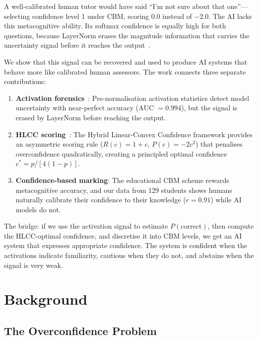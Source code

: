 \documentclass[11pt,a4paper]{article}
\begin{document}
A well-calibrated human tutor would have said ``I'm not sure about that one''---selecting confidence level 1 under CBM, scoring $0.0$ instead of $-2.0$.
The AI lacks this metacognitive ability.
Its softmax confidence is equally high for both questions, because LayerNorm erases the magnitude information that carries the uncertainty signal before it reaches the output~\citep{mccallum2026activation}.

We show that this signal can be recovered and used to produce AI systems that behave more like calibrated human assessors.
The work connects three separate contributions:

\begin{enumerate}
    \item \textbf{Activation forensics}~\citep{mccallum2026activation}: Pre-normalisation activation statistics detect model uncertainty with near-perfect accuracy (AUC $= 0.994$), but the signal is erased by LayerNorm before reaching the output.

    \item \textbf{HLCC scoring}~\citep{mccallum2026hlcc}: The Hybrid Linear-Convex Confidence framework provides an asymmetric scoring rule ($R(c) = 1+c$, $P(c) = -2c^2$) that penalises overconfidence quadratically, creating a principled optimal confidence $c^* = p/[4(1-p)]$.

    \item \textbf{Confidence-based marking}: The educational CBM scheme rewards metacognitive accuracy, and our data from 129 students shows humans naturally calibrate their confidence to their knowledge ($r = 0.91$) while AI models do not.
\end{enumerate}

The bridge: if we use the activation signal to estimate $P(\text{correct})$, then compute the HLCC-optimal confidence, and discretise it into CBM levels, we get an AI system that expresses appropriate confidence.
The system is confident when the activations indicate familiarity, cautious when they do not, and abstains when the signal is very weak.

\section{Background}

\subsection{The Overconfidence Problem}
\end{document}
